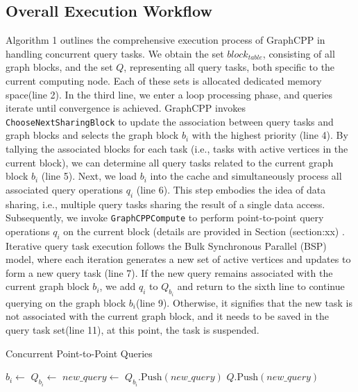 \documentclass[lettersize,journal]{IEEEtran} %
\begin{document}
\subsection{Overall Execution Workflow}
Algorithm 1 outlines the comprehensive execution process of GraphCPP in handling concurrent query tasks. We obtain the set \(block_{table}\), consisting of all graph blocks, and the set \(Q\), representing all query tasks, both specific to the current computing node. Each of these sets is allocated dedicated memory space(line 2). In the third line, we enter a loop processing phase, and queries iterate until convergence is achieved. GraphCPP invokes \texttt{ChooseNextSharingBlock} to update the association between query tasks and graph blocks and selects the graph block \(b_i\) with the highest priority (line 4). By tallying the associated blocks for each task (i.e., tasks with active vertices in the current block), we can determine all query tasks related to the current graph block \(b_i\) (line 5). Next, we load \(b_i\) into the cache and simultaneously process all associated query operations \(q_i\) (line 6). This step embodies the idea of data sharing, i.e., multiple query tasks sharing the result of a single data access. Subsequently, we invoke \texttt{GraphCPPCompute} to perform point-to-point query operations \(q_i\) on the current block (details are provided in Section (section:xx) . Iterative query task execution follows the Bulk Synchronous Parallel (BSP) model, where each iteration generates a new set of active vertices and updates to form a new query task (line 7). If the new query remains associated with the current graph block \(b_i\), we add \(q_i\) to \(Q_{b_i}\) and return to the sixth line to continue querying on the graph block \(b_i\)(line 9). Otherwise, it signifies that the new task is not associated with the current graph block, and it needs to be saved in the query task set(line 11), at this point, the task is suspended.

\begin{algorithm}
\caption{Concurrent Point-to-Point Queries}
\label{alg:concurrent_queries}
\begin{algorithmic}[1]

    \State {}
        \State $b_i \gets$ 
        \State $Q_{b_i} \gets$ 
            \State $new\_query \gets$ 
                \State $Q_{b_i}.\text{Push}(new\_query)$
            \Else
                \State $Q.\text{Push}(new\_query)$
            \EndIf
        \EndFor
    \EndWhile
\EndFunction

\end{algorithmic}
\end{algorithm}
  
\end{document}
